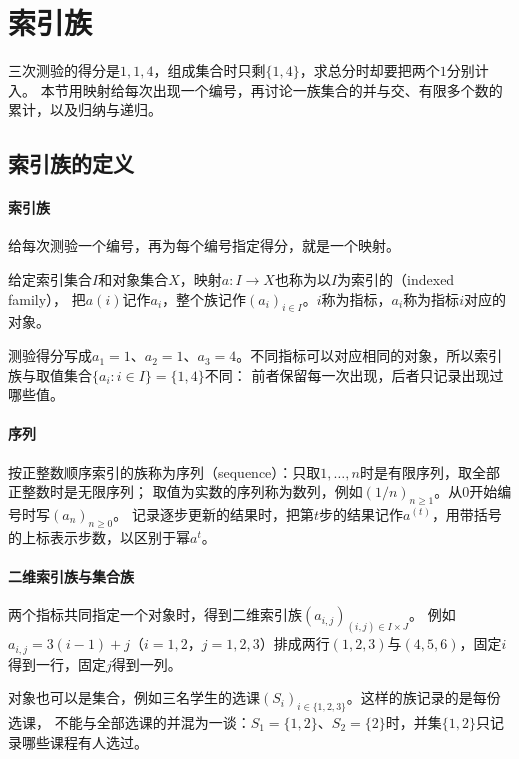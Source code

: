 \section{索引族}
\label{sec:prelim-indices-sums-recurrences}

三次测验的得分是$1,1,4$，组成集合时只剩$\{1,4\}$，求总分时却要把两个$1$分别计入。
本节用映射给每次出现一个编号，再讨论一族集合的并与交、有限多个数的累计，以及归纳与递归。

\subsection{索引族的定义}
\label{sec:prelim-indexed-sequences}

\paragraph{索引族}
给每次测验一个编号，再为每个编号指定得分，就是一个映射。
\begin{definition}[索引族]
\label{def:prelim-indexed-family}
给定索引集合$I$和对象集合$X$，映射$a:I\to X$也称为以$I$为索引的（indexed family），
把$a(i)$记作$a_i$，整个族记作$(a_i)_{i\in I}$。$i$称为指标，$a_i$称为指标$i$对应的对象。
\end{definition}
测验得分写成$a_1=1$、$a_2=1$、$a_3=4$。不同指标可以对应相同的对象，所以索引族与取值集合$\{a_i:i\in I\}=\{1,4\}$不同：
前者保留每一次出现，后者只记录出现过哪些值。

\paragraph{序列}
按正整数顺序索引的族称为序列（sequence）：只取$1,\ldots,n$时是有限序列，取全部正整数时是无限序列；
取值为实数的序列称为数列，例如$(1/n)_{n\geq1}$。从$0$开始编号时写$(a_n)_{n\geq0}$。
记录逐步更新的结果时，把第$t$步的结果记作$a^{(t)}$，用带括号的上标表示步数，以区别于幂$a^t$。

\paragraph{二维索引族与集合族}
两个指标共同指定一个对象时，得到二维索引族$(a_{i,j})_{(i,j)\in I\times J}$。
例如$a_{i,j}=3(i-1)+j$（$i=1,2$，$j=1,2,3$）排成两行$(1,2,3)$与$(4,5,6)$，固定$i$得到一行，固定$j$得到一列。

对象也可以是集合，例如三名学生的选课$(S_i)_{i\in\{1,2,3\}}$。这样的族记录的是每份选课，
不能与全部选课的并混为一谈：$S_1=\{1,2\}$、$S_2=\{2\}$时，并集$\{1,2\}$只记录哪些课程有人选过。

